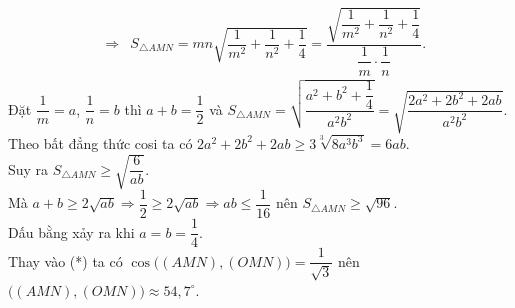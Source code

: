 \begin{bt}
{\begin{eqnarray*}
&\Rightarrow& S_{\triangle AMN}=mn\sqrt{\dfrac{1}{m^2}+\dfrac{1}{n^2}+\dfrac{1}{4}}=\dfrac{\sqrt{\dfrac{1}{m^2}+\dfrac{1}{n^2}+\dfrac{1}{4}}}{\dfrac{1}{m}\cdot\dfrac{1}{n}}.
\end{eqnarray*}
Đặt $\dfrac{1}{m}=a$, $\dfrac{1}{n}=b$ thì $a+b=\dfrac{1}{2}$ và ${S_{\triangle AMN}}=\sqrt{\dfrac{a^2+b^2+\dfrac{1}{4}}{a^2b^2}}=\sqrt{\dfrac{2a^2+2b^2+2ab}{a^2{b^2}}}$.\\
Theo bất đẳng thức cosi ta có $2a^2+2b^2+2ab\ge 3\sqrt[3]{8a^3{b^3}}=6ab$.\\
Suy ra ${S_{\triangle AMN}}\ge \sqrt{\dfrac{6}{ab}}$.\\
Mà $a+b\ge 2\sqrt{ab}\Rightarrow \dfrac{1}{2}\ge 2\sqrt{ab}\Rightarrow ab\le \dfrac{1}{16}$ nên ${S_{\triangle AMN}}\ge \sqrt{96}$.\\
Dấu bằng xảy ra khi $a=b=\dfrac{1}{4}$.\\ 
Thay vào (*) ta có $\cos\big((AMN),( OMN)\big)=\dfrac{1}{\sqrt{3}}$ nên $\big((AMN),(OMN)\big)\approx 54{,}7^\circ$.
	}
\end{bt}

